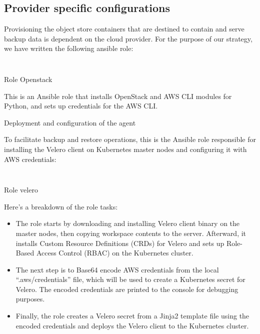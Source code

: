  \subsection{Provider specific configurations }

Provisioning the object store containers that are destined to contain and serve backup data is dependent on the cloud provider. For the purpose of our strategy, we have written the following ansible role: 

\begin{listing}[H]
    \inputminted[firstline=1,lastline=34]{Yaml}{codeListing/role_openstack.yml}
\end{listing}

\begin{listing}[H]
    \inputminted[firstline=35]{Yaml}{codeListing/role_openstack.yml}
    \caption{Role Openstack}
    \label{lst:role openstack}
\end{listing}
This is an Ansible role that installs OpenStack and AWS CLI modules for Python, and sets up credentials for the AWS CLI. 

 

Deployment and configuration of the agent 

To facilitate backup and restore operations, this is the Ansible role responsible for installing the Velero client on Kubernetes master nodes and configuring it with AWS credentials: 

\begin{listing}[H]
\inputminted[firstline=1,lastline=41]{Yaml}{codeListing/role_velero.yml}
\end{listing}

\begin{listing}[H]
\inputminted[firstline=42]{Yaml}{codeListing/role_velero.yml}
\caption{Role velero}
\label{lst:role velero}
\end{listing}

Here's a breakdown of the role tasks: 
\begin{itemize}[label={--}]
\item The role starts by downloading and installing Velero client binary on the master nodes, then copying workspace contents to the server. Afterward, it installs Custom Resource Definitions (CRDs) for Velero and sets up Role-Based Access Control (RBAC) on the Kubernetes cluster. 
\item  The next step is to Base64 encode AWS credentials from the local “.aws/credentials” file, which will be used to create a Kubernetes secret for Velero. The encoded credentials are printed to the console for debugging purposes. 
\item Finally, the role creates a Velero secret from a Jinja2 template file using the encoded credentials and deploys the Velero client to the Kubernetes cluster. 
\end{itemize}
 

